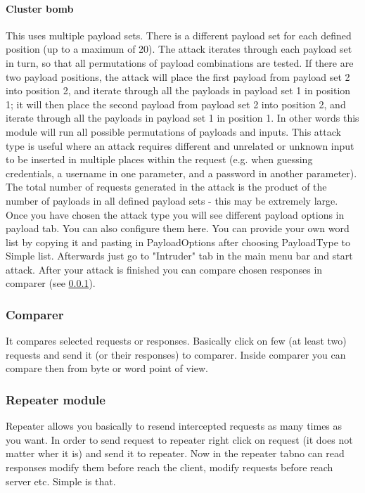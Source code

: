 \documentclass{article}[12pt]
\begin{document}
\paragraph{Cluster bomb}
This uses multiple payload sets.
There is a different payload set for each defined position (up to a maximum of 20).
The attack iterates through each payload set in turn, so that all permutations of payload combinations are tested.
If there are two payload positions, the attack will place the first payload from payload set 2 into position 2, and iterate through all the payloads in payload set 1 in position 1;
it will then place the second payload from payload set 2 into position 2, and iterate through all the payloads in payload set 1 in position 1.
In other words this module will run all possible permutations of payloads and inputs.
This attack type is useful where an attack requires different and unrelated or unknown input to be inserted in multiple places within the request (e.g. when guessing credentials, a username in one parameter, and a password in another parameter).
The total number of requests generated in the attack is the product of the number of payloads in all defined payload sets - this may be extremely large.
\newline
Once you have chosen the attack type you will see different payload options in payload tab.
You can also configure them here.
You can provide your own word list by copying it and pasting in PayloadOptions after choosing PayloadType to Simple list.
Afterwards just go to "Intruder" tab in the main menu bar and start attack.
After your attack is finished you can compare chosen responses in comparer (see \ref{subsubsec:comparer}).

\subsubsection{Comparer}
\label{subsubsec:comparer}
It compares selected requests or responses.
Basically click on few (at least two) requests and send it (or their responses) to comparer.
Inside comparer you can compare then from byte or word point of view.

\subsubsection{Repeater module}

Repeater allows you basically to resend intercepted requests as many times as you want.
In order to send request to repeater right click on request (it does not matter wher it is) and send it to repeater.
Now in the repeater tabno can read responses modify them before reach the client, modify requests before reach server etc.
Simple is that.
\end{document}
